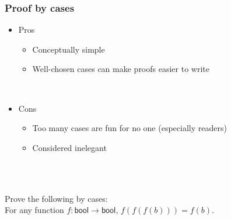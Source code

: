 
\begin{frame}
  \frametitle{Proof by cases}
  \begin{itemize}
  \item Pros
    \begin{itemize}
    \item Conceptually simple
    \item Well-chosen cases can make proofs easier to write
    \end{itemize}
    \qquad\\
  \item Cons
    \begin{itemize}
    \item Too many cases are fun for no one (especially readers)
    \item Considered inelegant
    \end{itemize}
    \qquad\\\qquad\\
  \end{itemize}
  \exer Prove the following by cases:\\For any function
  $f:\textsf{bool}\rightarrow\textsf{bool}$, $f(f(f(b))) = f(b)$.
\end{frame}
